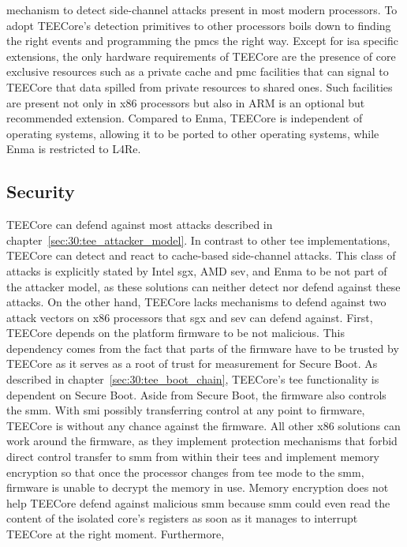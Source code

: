 mechanism to detect side-channel attacks present in most modern processors. To
adopt TEECore's detection primitives to other processors boils down to finding
the right events and programming the \glspl{pmc} the right way. Except for
\gls{isa} specific extensions, the only hardware requirements of TEECore are the
presence of core exclusive resources such as a private cache and \gls{pmc}
facilities that can signal to TEECore that data spilled from private resources
to shared ones. Such facilities are present not only in x86 processors but also
in ARM is an optional but recommended extension. Compared to Enma, TEECore is
independent of operating systems, allowing it to be ported to other operating
systems, while Enma is restricted to L4Re.

\subsection{Security}
\label{eval:compare:security}
TEECore can defend against most attacks described in
chapter~\ref{sec:30:tee_attacker_model}. In contrast to other \gls{tee}
implementations, TEECore can detect and react to cache-based side-channel
attacks. This class of attacks is explicitly stated by Intel \gls{sgx}, AMD
\gls{sev}, and Enma to be not part of the attacker model, as these solutions can
neither detect nor defend against these attacks. On the other hand, TEECore
lacks mechanisms to defend against two attack vectors on x86 processors that
\gls{sgx} and \gls{sev} can defend against. First, TEECore depends on the
platform firmware to be not malicious. This dependency comes from the fact that
parts of the firmware have to be trusted by TEECore as it serves as a root of
trust for measurement for Secure Boot. As described in
chapter~\ref{sec:30:tee_boot_chain}, TEECore's \gls{tee} functionality is
dependent on Secure Boot. Aside from Secure Boot, the firmware also controls the
\gls{smm}. With \gls{smi} possibly transferring control at any point to
firmware, TEECore is without any chance against the firmware. All other x86
solutions can work around the firmware, as they implement protection mechanisms
that forbid direct control transfer to \gls{smm} from within their \glspl{tee}
and implement memory encryption so that once the processor changes from
\gls{tee} mode to the \gls{smm}, firmware is unable to decrypt the memory in
use. Memory encryption does not help TEECore defend against malicious \gls{smm}
because \gls{smm} could even read the content of the isolated core's registers
as soon as it manages to interrupt TEECore at the right moment. Furthermore,
